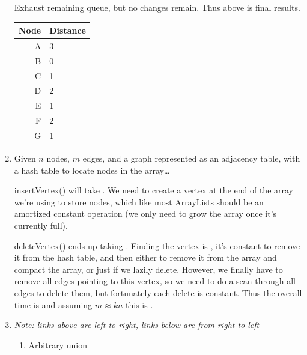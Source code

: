 \documentclass[12pt]{chmullighw}
\begin{document}
\begin{enumerate}
Exhaust remaining queue, but no changes remain. Thus above is final results.

\begin{tabular}{ r | l }
Node & Distance \\
\hline
A & 3 \\
B & 0 \\
C & 1 \\
D & 2 \\
E & 1 \\
F & 2 \\
G & 1 \\
\end{tabular}

\item Given $n$ nodes, $m$ edges, and a graph represented as an adjacency table,
with a hash table to locate nodes in the array\ldots

insertVertex() will take . We need to create a vertex at the end of the
array we're using to store nodes, which like most ArrayLists should be an
amortized constant operation (we only need to grow the array once it's currently
full).

deleteVertex() ends up taking . Finding the vertex is , it's
constant to remove it from the hash table, and then either  to
remove it from the array and compact the array, or just  if we
lazily delete.  However, we finally have to remove all edges pointing to this
vertex, so we need to do a  scan through all edges to delete them, but
fortunately each delete is constant. Thus the overall time is  and
assuming $m \approx kn$ this is .

\item {\em Note: links above are left to right, links below are from right to left}

\begin{enumerate} \renewcommand{\labelenumii}{\alph{enumii}.}
    \item Arbitrary union

\end{enumerate}
\end{enumerate}
\end{document}
